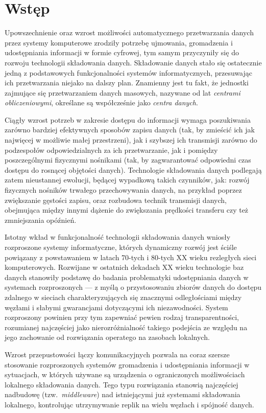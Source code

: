 \chapter{Wstęp} \label{chapter:intro}

Upowszechnienie oraz wzrost możliwości automatycznego przetwarzania danych przez systemy komputerowe zrodziły potrzebę ujmowania, gromadzenia i udostępniania informacji w formie cyfrowej, tym samym przyczyniły się do rozwoju technologii składowania danych. Składowanie danych stało się ostatecznie jedną z podstawowych funkcjonalności systemów informatycznych, przesuwając ich przetwarzania niejako na dalszy plan. Znamienny jest tu fakt, że jednostki zajmujące się przetwarzaniem danych masowych, nazywane od lat \textit{centrami obliczeniowymi}, określane są współcześnie jako \textit{centra danych}.

Ciągły wzrost potrzeb w zakresie dostępu do informacji wymaga poszukiwania zarówno bardziej efektywnych sposobów zapisu danych (tak, by zmieścić ich jak najwięcej w możliwie małej przestrzeni), jak i szybszej ich transmisji zarówno do podzespołów odpowiedzialnych za ich przetwarzanie, jak i pomiędzy poszczególnymi fizycznymi nośnikami (tak, by zagwarantować odpowiedni czas dostępu do rosnącej objętości danych). Technologie składowania danych podlegają zatem nieustannej ewolucji, będącej wypadkową takich czynników, jak: rozwój fizycznych nośników trwałego przechowywania danych, na przykład poprzez zwiększanie gęstości zapisu, oraz rozbudowa technik transmisji danych, obejmująca między innymi dążenie do zwiększania prędkości transferu czy też zmniejszania opóźnień.

Istotny wkład w funkcjonalność technologii składowania danych wniosły rozproszone systemy informatyczne, których dynamiczny rozwój jest ściśle powiązany z powstawaniem w latach 70-tych i 80-tych XX wieku rezległych sieci komputerowych. Rozwijane w ostatnich dekadach XX wieku technologie baz danych stanowiły podstawę do badania problematyki udostępniania danych w systemach rozproszonych --- z myślą o przystosowaniu zbiorów danych do dostępu zdalnego w sieciach charakteryzujących się znacznymi odległościami między węzłami i słabymi gwarancjami dotyczącymi ich niezawodności. System rozproszony powinien przy tym zapewniać pewien rodzaj transparentności, rozumianej najczęściej jako nierozróżnialność takiego podejścia ze względu na jego zachowanie od rozwiązania operatego na zasobach lokalnych.

Wzrost przepustowości łączy komunikacyjnych pozwala na coraz szersze stosowanie rozproszonych systemów gromadzenia i udostępniania informacji w sytuacjach, w których używane są urządzenia o ograniczonych możliwościach lokalnego składowania danych. Tego typu rozwiązania stanowią najczęściej nadbudowę (tzw.\ \textit{middleware}) nad istniejącymi już systemami składowania lokalnego, kontrolując utrzymywanie replik na wielu węzłach i spójność danych.


